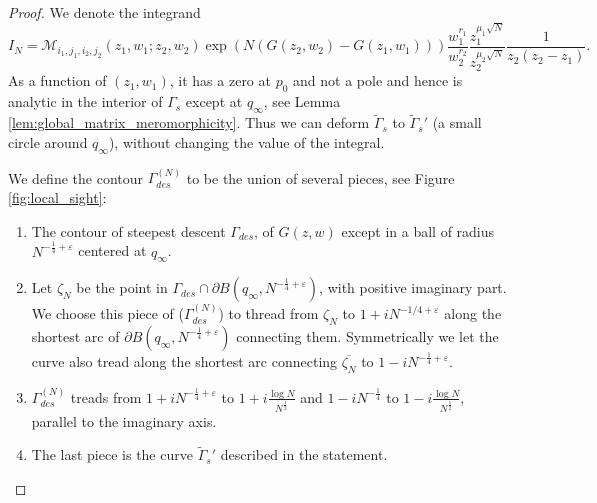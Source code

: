\documentclass[11pt]{article}
\theoremstyle{plain}
\theoremstyle{definition}
\numberwithin{equation}{section}
\begin{document}
\begin{proof}

We denote the integrand
\begin{equation}\label{eqn:integrand_to_bound}
I_N=\boldsymbol{\mathcal{M}}_{i_1,j_1,i_2,j_2}(z_1,w_1;z_2,w_2) 
\exp\left({N(G(z_2,w_2)-G(z_1,w_1))}\right)
\frac{w_1^{r_1}}{w_2^{r_2}}
 \frac{z_1^{\mu_1\sqrt{N}}}{z_2^{\mu_2\sqrt{N}}}
 \frac{1}{z_2(z_2-z_1)}.
\end{equation}
As a function of $(z_1,w_1)$, it has a zero at $p_0$ and not a pole and hence is analytic in the interior of $\Gamma_s$ except at $q_{\infty}$, see Lemma \ref{lem:global_matrix_meromorphicity}. Thus we can deform $\widetilde{\Gamma}_s$ to $\widetilde{\Gamma}_s'$ (a small circle around $q_{\infty}$), without changing the value of the integral.


We define the contour $\Gamma_{des}^{(N)}$ to be the union of several pieces, see Figure \ref{fig:local_sight}:
\begin{enumerate}
\item The contour of steepest descent $\Gamma_{des}$, of $G(z,w)$ except in a ball of radius $N^{-\frac{1}{4}+\varepsilon}$ centered at $q_{\infty}$. 

\item Let $\zeta_N$ be the point in $\Gamma_{des}\cap \partial B(q_{\infty}, N^{-\frac{1}{4}+\varepsilon})$, with positive imaginary part. We choose this piece of ($\Gamma_{des}^{(N)}$) to thread from $\zeta_N$ to $1+iN^{-1/4+\varepsilon}$ along the shortest arc of $\partial B(q_{\infty}, N^{-\frac{1}{4}+\varepsilon})$ connecting them. Symmetrically we let the curve also tread along the shortest arc connecting $\overline{\zeta_N}$ to $1-iN^{-\frac{1}{4}+\varepsilon}$.



\item $\Gamma_{des}^{(N)}$ treads from $1+iN^{-\frac{1}{4}+\varepsilon}$ to $1+i\frac{\log N}{N^{\frac{1}{2}}}$ and $1-i N^{-\frac{1}{4}}$ to $1-i\frac{\log N}{N^{\frac{1}{2}}}$, parallel to the imaginary axis. %
% 
\item The last piece is the curve $\widetilde{\Gamma}_s'$ described in the statement.

 \end{enumerate}
 \begin{figure}
 \begin{center}
\end{center}
\end{figure}
\end{proof}
\end{document}
